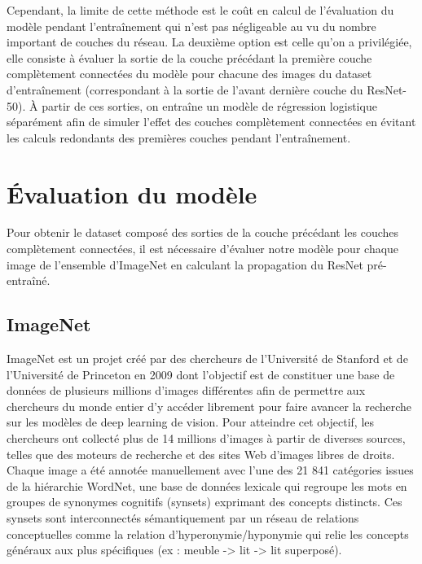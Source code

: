 \documentclass[12pt,english, openany]{book}
\begin{document}
Cependant, la limite de cette méthode est le coût en calcul de l'évaluation du modèle pendant l'entraînement qui n'est pas négligeable au vu du nombre important de couches du réseau. La deuxième option est celle qu'on a privilégiée, elle consiste à évaluer la sortie de la couche précédant la première couche complètement connectées du modèle pour chacune des images du dataset d'entraînement (correspondant à la sortie de l'avant dernière couche du ResNet-50). À partir de ces sorties, on entraîne un modèle de régression logistique séparément afin de simuler l'effet des couches complètement connectées en évitant les calculs redondants des premières couches pendant l'entraînement.

\section{Évaluation du modèle}

Pour obtenir le dataset composé des sorties de la couche précédant les couches complètement connectées, il est nécessaire d'évaluer notre modèle pour chaque image de l'ensemble d'ImageNet en calculant la propagation du ResNet pré-entraîné.

\subsection{ImageNet}
\label{subsec:ImageNet}
ImageNet est un projet créé par des chercheurs de l'Université de Stanford et de l'Université de Princeton en 2009 dont l'objectif est de constituer une base de données de plusieurs millions d'images différentes afin de permettre aux chercheurs du monde entier d'y accéder librement pour faire avancer la recherche sur les modèles de deep learning de vision. Pour atteindre cet objectif, les chercheurs ont collecté plus de 14 millions d'images à partir de diverses sources, telles que des moteurs de recherche et des sites Web d'images libres de droits.\\

Chaque image a été annotée manuellement avec l'une des 21 841 catégories issues de la hiérarchie WordNet, une base de données lexicale qui regroupe les mots en groupes de synonymes cognitifs (synsets) exprimant des concepts distincts. Ces synsets sont interconnectés sémantiquement par un réseau de relations conceptuelles comme la relation d'hyperonymie/hyponymie qui relie les concepts généraux aux plus spécifiques (ex : meuble -> lit -> lit superposé).\\
\end{document}
